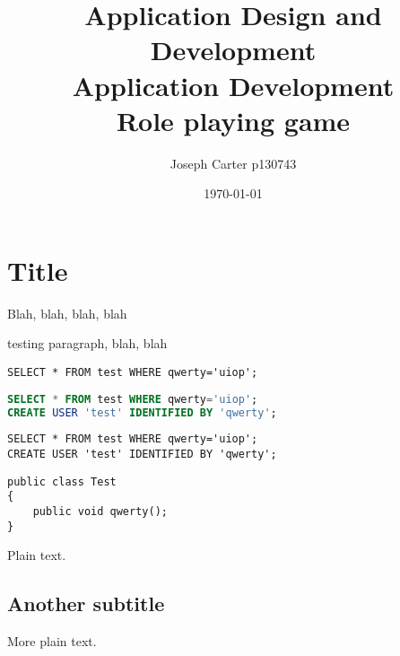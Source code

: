 \documentclass{template}
\author{Joseph Carter p130743}
\title{\textbf{Application Design and Development\\Application Development}\\ Role playing game}
\date{\today}
\begin{document}
\maketitle

\tableofcontents

\section{Title}
Blah, blah, blah, blah

testing paragraph, blah, blah

\begin{lstlisting}
SELECT * FROM test WHERE qwerty='uiop';
\end{lstlisting}

\begin{lstlisting}[language=sql]
SELECT * FROM test WHERE qwerty='uiop';
CREATE USER 'test' IDENTIFIED BY 'qwerty';
\end{lstlisting}

\begin{lstlisting}[language=orasql]
SELECT * FROM test WHERE qwerty='uiop';
CREATE USER 'test' IDENTIFIED BY 'qwerty';
\end{lstlisting}

\begin{lstlisting}[language={[Sharp]C}]
public class Test
{
	public void qwerty();
}
\end{lstlisting}

Plain text.

\subsection{Another subtitle}

More plain text.
\end{document}
